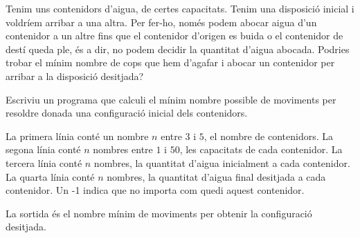 

\Statement

Tenim uns contenidors d'aigua, de certes capacitats. Tenim una disposició inicial i voldríem arribar a una altra. 
Per fer-ho, només podem abocar aigua d'un contenidor a un altre fins que el contenidor d'origen es buida o el contenidor
de destí queda ple, és a dir, no podem decidir la quantitat d'aigua abocada. Podries trobar el mínim nombre de cops que
hem d'agafar i abocar un contenidor per arribar a la disposició desitjada?

\medskip

Escriviu un programa que calculi el mínim nombre possible de moviments per resoldre donada una configuració inicial dels contenidors.

\Input

La primera línia conté un nombre $n$ entre $3$ i $5$, el nombre de contenidors.
La segona línia conté $n$ nombres entre $1$ i $50$, les capacitats de cada contenidor.
La tercera línia conté $n$ nombres, la quantitat d'aigua inicialment a cada contenidor.
La quarta línia conté $n$ nombres, la quantitat d'aigua final desitjada a cada contenidor. Un -1 indica que no importa com quedi aquest contenidor.

\Output

La sortida és el nombre mínim de moviments per obtenir la configuració desitjada.


\Sample

